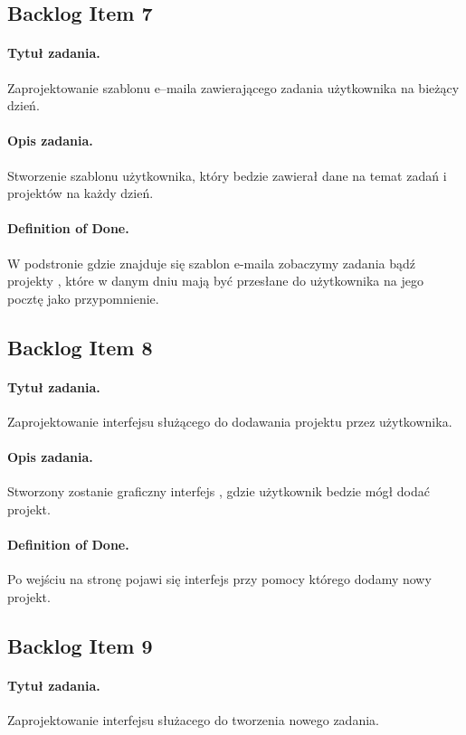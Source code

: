 \documentclass[a4paper]{article}
\begin{document}
\subsection{Backlog Item 7} 
\paragraph{Tytuł zadania.} Zaprojektowanie szablonu e--maila zawierającego zadania użytkownika na bieżący dzień.
\paragraph{Opis zadania.} Stworzenie szablonu użytkownika, który bedzie zawierał dane na temat zadań i projektów na każdy dzień.
\paragraph{Definition of Done.} W podstronie gdzie znajduje się szablon e-maila zobaczymy zadania bądź projekty , które w danym dniu mają być przesłane do użytkownika na jego pocztę jako przypomnienie.

\subsection{Backlog Item 8} 
\paragraph{Tytuł zadania.} Zaprojektowanie interfejsu służącego do dodawania projektu przez użytkownika.
\paragraph{Opis zadania.} Stworzony zostanie graficzny interfejs , gdzie użytkownik bedzie mógł dodać projekt.
\paragraph{Definition of Done.} Po wejściu na stronę pojawi się interfejs przy pomocy którego dodamy nowy projekt.

\subsection{Backlog Item 9} 
\paragraph{Tytuł zadania.} Zaprojektowanie interfejsu służacego do tworzenia nowego zadania.
\end{document}
